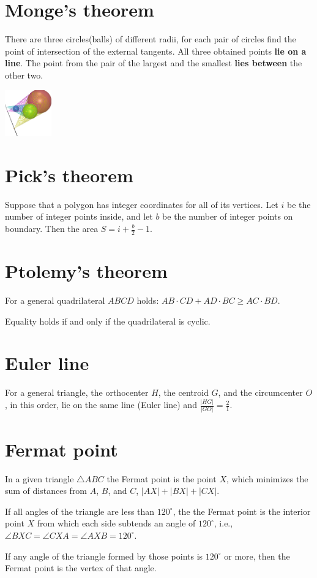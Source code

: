 \section*{Monge's theorem}
There are three circles(balls) of different radii, 
for each pair of circles find the point of intersection of the external tangents. 
All three obtained points \textbf{lie on a line}. 
The point from the pair of the largest and the smallest \textbf{lies between} the other two.

\begin{center}
  \includegraphics[width=0.15\textwidth, center]{content/mathematics/monges-theorem.png}
\end{center}

\section*{Pick's theorem}
Suppose that a polygon has integer coordinates for all of its vertices. 
Let $i$ be the number of integer points inside, and let $b$ be the number of integer points on boundary. 
Then the area $S = i + \tfrac{b}{2} - 1$.

\section*{Ptolemy's theorem}
For a general quadrilateral $ABCD$ holds:
$AB \cdot CD + AD \cdot BC \ge AC \cdot BD$.

Equality holds if and only if the quadrilateral is cyclic.

\section*{Euler line}
For a general triangle, the orthocenter $H$, the centroid $G$, 
and the circumcenter $O$, in this order, lie on the same line (Euler line) 
and $\frac{|HG|}{|GO|} = \frac{2}{1}$.

\section*{Fermat point}

In a given triangle $\triangle ABC$ the Fermat point is the point $X$,
which minimizes the sum of distances from $A$, $B$, and $C$,
$|AX| + |BX| + |CX|$.

If all angles of the triangle are less than $120^\circ$,
the the Fermat point is the interior point $X$
from which each side subtends an angle of $120^\circ$, i.e., 
$\angle BXC = \angle CXA = \angle AXB = 120^\circ$.

If any angle of the triangle formed by those points is $120^\circ$ or more,
then the Fermat point is the vertex of that angle.
